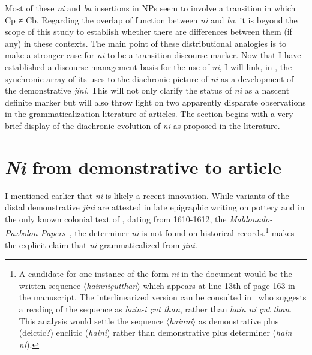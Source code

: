\documentclass[output=paper
,modfonts
,nonflat]{langsci/langscibook}
\begin{document}
Most of these \textit{ni} and \textit{ba} insertions in NPs seem to involve a transition in which Cp ≠ Cb.
Regarding the overlap of function between \textit{ni} and \textit{ba}, it is beyond the scope of this study to establish whether there are differences between them (if any) in these contexts. 
The main point of these distributional analogies is to make a stronger case for \textit{ni} to be a transition discourse-marker.
Now that I have established a discourse-management basis for the use of \textit{ni}, I will link, in , the synchronic array of its uses to the diachronic picture of \textit{ni} as a development of the demonstrative \textit{jini}. This will not only clarify the status of \textit{ni} as a nascent definite marker but will also throw light on two apparently disparate observations in the grammaticalization literature of articles. The section begins with a very brief display of the diachronic evolution of \textit{ni} as proposed in the literature. 

\section{\textit{Ni} from demonstrative to article}\label{sec:pico:4}

I mentioned earlier that \textit{ni} is likely a recent innovation. While variants of the distal demonstrative \textit{jini} are attested in late epigraphic writing on pottery \citep[][114, 120--121]{Mora-Marin2009} and in the only known colonial text of , dating from 1610-1612, the \textit{Maldonado-Paxbolon-Papers}~\citep{Smailus1975}, the determiner \textit{ni} is not found on historical records.\footnote{A candidate for one instance of the form \textit{ni} in the document would be the written sequence $\langle$\textit{hainniçutthan}$\rangle$ which appears at line 13th of page 163 in the manuscript. The interlinearized version can be consulted in~\citet[][71, 158]{Smailus1975} who suggests a reading of the sequence as \textit{hain-i çut than}, rather than \textit{hain ni çut than}. This analysis would settle the sequence $\langle$\textit{hainni}$\rangle$ as demonstrative plus (deictic?) enclitic (\textit{haini}) rather than demonstrative plus determiner (\textit{hain ni}).} \citet[][120-121]{Mora-Marin2009} makes the explicit claim that \textit{ni} grammaticalized from \textit{jini}.\newpage
\end{document}
